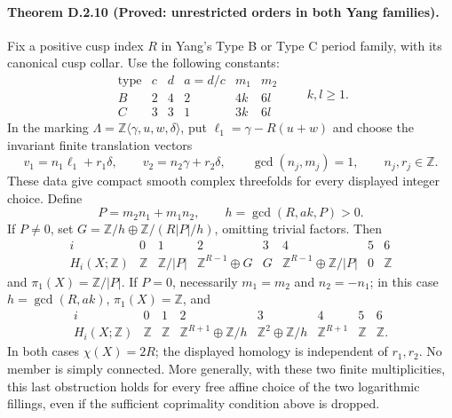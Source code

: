\paragraph{Theorem D.2.10 (Proved: unrestricted orders in both Yang families).}
Fix a positive cusp index $R$ in Yang's Type B or Type C period
family, with its canonical cusp collar. Use the following constants:
\[
 \begin{array}{c|ccc|cc}
 \text{type}&c&d&a=d/c&m_1&m_2\\\hline
 B&2&4&2&4k&6l\\
 C&3&3&1&3k&6l
 \end{array}
 \qquad k,l\geq1.
\]
In the marking $\Lambda=\mathbb Z\langle\gamma,u,w,\delta\rangle$,
put $\ell_1=\gamma-R(u+w)$ and choose the invariant finite
translation vectors
\[
 v_1=n_1\ell_1+r_1\delta,\qquad
 v_2=n_2\gamma+r_2\delta,\qquad
 \gcd(n_j,m_j)=1,
 \qquad n_j,r_j\in\mathbb Z.
\]
These data give compact smooth complex threefolds for every displayed
integer choice. Define
\[
 P=m_2n_1+m_1n_2,\qquad h=\gcd(R,ak,P)>0.
\]
If $P\ne0$, set
$G=\mathbb Z/h\oplus\mathbb Z/(R|P|/h)$, omitting trivial factors.
Then
\[
 \begin{array}{c|ccccccc}
 i&0&1&2&3&4&5&6\\\hline
 H_i(X;\mathbb Z)&\mathbb Z&\mathbb Z/|P|&
 \mathbb Z^{R-1}\oplus G&G&
 \mathbb Z^{R-1}\oplus\mathbb Z/|P|&0&\mathbb Z
 \end{array}
\]
and $\pi_1(X)=\mathbb Z/|P|$.
If $P=0$, necessarily $m_1=m_2$ and $n_2=-n_1$; in this case
$h=\gcd(R,ak)$, $\pi_1(X)=\mathbb Z$, and
\[
 \begin{array}{c|ccccccc}
 i&0&1&2&3&4&5&6\\\hline
 H_i(X;\mathbb Z)&\mathbb Z&\mathbb Z&
 \mathbb Z^{R+1}\oplus\mathbb Z/h&
 \mathbb Z^2\oplus\mathbb Z/h&\mathbb Z^{R+1}&
 \mathbb Z&\mathbb Z.
 \end{array}
\]
In both cases $\chi(X)=2R$; the displayed homology is independent
of $r_1,r_2$. No member is simply connected. More generally, with
these two finite multiplicities, this last obstruction holds for
every free affine choice of the two logarithmic fillings, even if
the sufficient coprimality condition above is dropped.

